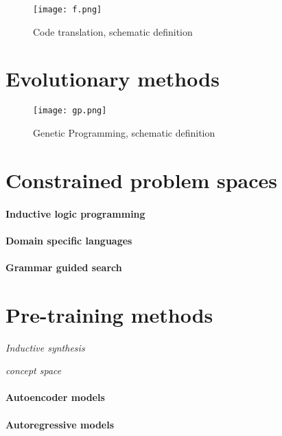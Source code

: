 \begin{figure}[H]
    \centering
    \texttt{[image: f.png]}
    \caption{Code translation, schematic definition}
    \label{fig:nl2ml}
\end{figure}

\newpage
\section{Evolutionary methods}

\begin{figure}[H]
    \centering
    \texttt{[image: gp.png]}
    \caption{Genetic Programming, schematic definition}
    \label{fig:gp}
\end{figure}

\newpage
\section{Constrained problem spaces}

\paragraph{Inductive logic programming}

\paragraph{Domain specific languages}

\paragraph{Grammar guided search}

\section{Pre-training methods}

\emph{Inductive synthesis}

\emph{concept space}

\paragraph{Autoencoder models}

\paragraph{Autoregressive models}

